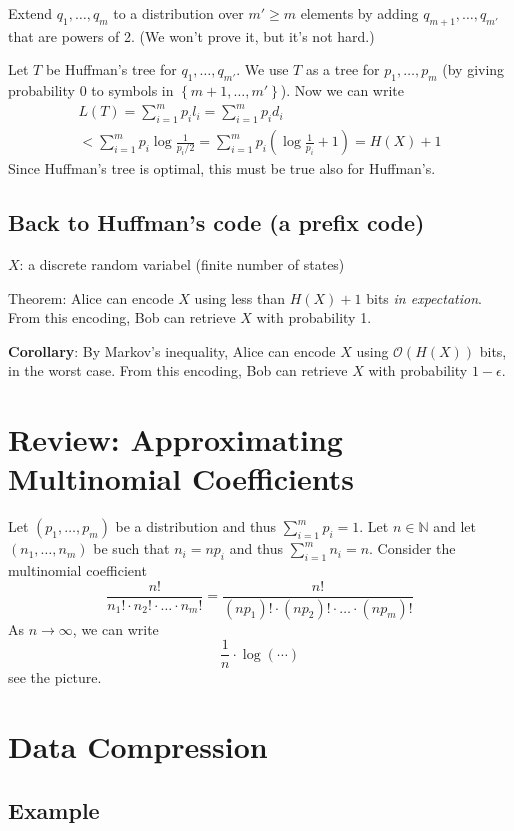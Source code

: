 \documentclass{article}
\begin{document}
Extend $q_1,\ldots,q_m$ to a distribution over $m'\geq m$ elements by adding $q_{m+1},\ldots,q_{m'}$ that are powers of 2. (We won't prove it, but it's not hard.)

Let $T$ be Huffman's tree for $q_1,\ldots,q_{m'}$. We use $T$ as a tree for $p_1,\ldots,p_m$ (by giving probability $0$ to symbols in $\left\{m+1,\ldots,m'\right\}$). Now we can write 
\begin{gather*}
    L(T) = \sum_{i=1 }^{m }p_i l_i = \sum_{i=1 }^{m }p_i d_i \\
    < \sum_{i=1 }^{m }p_i \log \frac{1 }{p_i/2 }= \sum_{i=1 }^{m }p_i \left(\log \frac{1 }{p_i }+ 1 \right)= H(X) + 1
\end{gather*}
Since Huffman's tree is optimal, this must be true also for Huffman's.

\subsection{Back to Huffman's code (a prefix code)}

$X$: a discrete random variabel (finite number of states)

Theorem: Alice can encode $X$ using less than $H(X)+1$ bits \textit{in expectation}. From this encoding, Bob can retrieve $X$ with probability 1.

\textbf{Corollary}: By Markov's inequality, Alice can encode $X$ using $\mathcal{O}\left(H(X)\right)$ bits, in the worst case. From this encoding, Bob can retrieve $X$ with probability $1-\epsilon$.

\section{Review: Approximating Multinomial Coefficients}

Let $\left(p_1,\ldots,p_m\right)$ be a distribution and thus $\sum_{i=1 }^{m }p_i=1$. Let $n\in \mathbb{N }$ and let $\left(n_1,\ldots,n_m\right)$ be such that $n_i=np_i$ and thus $\sum_{i=1 }^{m }n_i=n$. Consider the multinomial coefficient
\[
\frac{n !}{n_1 !\cdot n_2 ! \cdot \ldots \cdot n_m!} = \frac{n!}{(np_1)!\cdot (np_2)!\cdot\ldots \cdot (np_m)!}
\]
As $n\to\infty$, we can write 
\[
\frac{1}{n}\cdot \log\left(\cdots\right)
\]
see the picture.

\section{Data Compression}

\subsection{Example}
\end{document}
